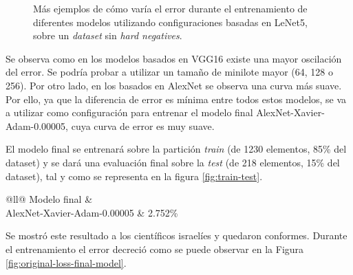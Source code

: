 \begin{figure}[H]
    \caption{Más ejemplos de cómo varía el error durante el entrenamiento de diferentes modelos utilizando configuraciones basadas en LeNet5, sobre un \textit{dataset} sin \textit{hard negatives}.}
\end{figure}

Se observa como en los modelos basados en VGG16 existe una mayor oscilación del error. Se podría probar a utilizar un tamaño de minilote mayor (64, 128 o 256). Por otro lado, en los basados en AlexNet se observa una curva más suave. Por ello, ya que la diferencia de error es mínima entre todos estos modelos, se va a utilizar como configuración para entrenar el modelo final AlexNet-Xavier-Adam-0.00005, cuya curva de error es muy suave.

El modelo final se entrenará sobre la partición \textit{train} (de 1230 elementos, 85\% del dataset) y se dará una evaluación final sobre la \textit{test} (de 218 elementos, 15\% del dataset), tal y como se representa en la figura \ref{fig:train-test}.

\begin{table}[H]
    \footnotesize
    \centering
    \caption{Porcentaje de error del modelo final sin \textit{hard negatives}.}
\begin{tabular}{@{}ll@{}}
\toprule
Modelo final              &  \\ \midrule
AlexNet-Xavier-Adam-0.00005 & 2.752\%                                                                                        \\ \bottomrule
\end{tabular}
\end{table}

Se mostró este resultado a los científicos israelíes y quedaron conformes. Durante el entrenamiento el error decreció como se puede observar en la Figura \ref{fig:original-loss-final-model}.

